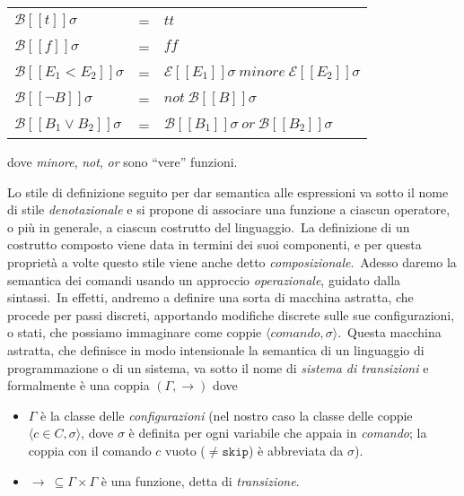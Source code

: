 \begin{table}[H]
    \centering
    \begin{tabular}{l c l}
        $\mathcal{B} [\![t]\!]\sigma$            & = & $\mathit{tt}$                                                                   \\
        $\mathcal{B} [\![f]\!]\sigma$            & = & $\mathit{ff}$                                                                   \\
        $\mathcal{B} [\![E_1 < E_2]\!]\sigma$    & = & $\mathcal{E} [\![E_1]\!]\sigma\ \mathit{minore}\ \mathcal{E} [\![E_2]\!]\sigma$ \\
        $\mathcal{B} [\![\lnot B]\!]\sigma$      & = & $\mathit{not}\ \mathcal{B} [\![B]\!]\sigma$                                     \\
        $\mathcal{B} [\![B_1 \lor B_2]\!]\sigma$ & = & $\mathcal{B} [\![B_1]\!]\sigma\ \mathit{or}\ \mathcal{B} [\![B_2]\!]\sigma$     \\
    \end{tabular}
\end{table}

\noindent dove \textit{minore}, \textit{not}, \textit{or} sono ``vere'' funzioni.\

\medskip

\noindent Lo stile di definizione seguito per dar semantica alle espressioni va sotto il nome di stile \textit{denotazionale} e si propone di associare una funzione a ciascun operatore, o più in generale, a ciascun costrutto del linguaggio.\
La definizione di un costrutto composto viene data in termini dei suoi componenti, e per questa proprietà a volte questo stile viene anche detto \textit{composizionale}.\
Adesso daremo la semantica dei comandi usando un approccio \textit{operazionale}, guidato dalla sintassi.\
In effetti, andremo a definire una sorta di macchina astratta, che procede per passi discreti, apportando modifiche discrete sulle sue configurazioni, o stati, che possiamo immaginare come coppie $\langle \mathit{comando}, \sigma\rangle$.\
Questa macchina astratta, che definisce in modo intensionale la semantica di un linguaggio di programmazione o di un sistema, va sotto il nome di \textit{sistema di transizioni} e formalmente è una coppia $(\Gamma, \rightarrow)$ dove

\begin{itemize}
    \item $\Gamma$ è la classe delle \textit{configurazioni} (nel nostro caso la classe delle coppie $\langle c \in C, \sigma\rangle$, dove $\sigma$ è definita per ogni variabile che appaia in \textit{comando}; la coppia con il comando $c$ vuoto ($\neq \mathtt{skip}$) è abbreviata da $\sigma$).
    \item $\rightarrow\ \subseteq \Gamma \times \Gamma$ è una funzione, detta di \textit{transizione}.\
\end{itemize}

